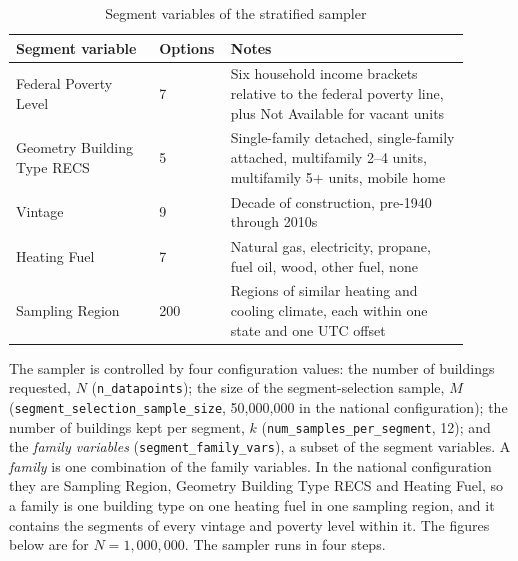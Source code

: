 \begin{table}
    \centering
    \begin{tabular}{p{0.3\linewidth}p{0.1\linewidth}p{0.5\linewidth}}
    \hline
    Segment variable & Options & Notes \\
    \hline
    Federal Poverty Level & 7 & Six household income brackets relative to the federal poverty line, plus Not Available for vacant units \\
    Geometry Building Type RECS & 5 & Single-family detached, single-family attached, multifamily 2--4 units, multifamily 5+ units, mobile home \\
    Vintage & 9 & Decade of construction, pre-1940 through 2010s \\
    Heating Fuel & 7 & Natural gas, electricity, propane, fuel oil, wood, other fuel, none \\
    Sampling Region & 200 & Regions of similar heating and cooling climate, each within one state and one UTC offset \\
    \hline
    \end{tabular}
    \caption{Segment variables of the stratified sampler}
    \label{tab:segment_vars}
\end{table}

The sampler is controlled by four configuration values: the number of buildings requested, $N$ (\texttt{n\_datapoints}); the size of the segment-selection sample, $M$ (\texttt{segment\_selection\_sample\_size}, 50,000,000 in the national configuration); the number of buildings kept per segment, $k$ (\texttt{num\_samples\_per\_segment}, 12); and the \textit{family variables} (\texttt{segment\_family\_vars}), a subset of the segment variables. A \textit{family} is one combination of the family variables. In the national configuration they are Sampling Region, Geometry Building Type RECS and Heating Fuel, so a family is one building type on one heating fuel in one sampling region, and it contains the segments of every vintage and poverty level within it. The figures below are for $N = 1{,}000{,}000$. The sampler runs in four steps.

